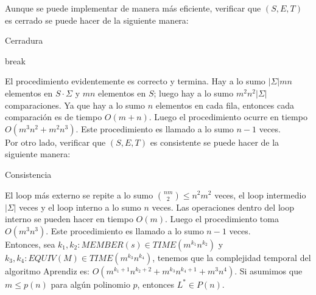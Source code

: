 \documentclass[12pt]{amsart}
\begin{document}
Aunque se puede implementar de manera más eficiente, verificar que $(S,E,T)$ es cerrado se puede hacer de la siguiente manera:

\begin{algorithm}
\caption{Cerradura}
\begin{algorithmic}[1]
                \State break
            \EndIf
        \EndFor
           \State {}
        \EndIf
    \EndFor
    \State {}
\EndProcedure
\end{algorithmic}
\end{algorithm}

El procedimiento evidentemente es correcto y termina. Hay a lo sumo $|\Sigma|mn$ elementos en $S \cdot \Sigma$ y $mn$ elementos en $S$; luego hay a lo sumo $m^2 n^2 |\Sigma|$ comparaciones. Ya que hay a lo sumo $n$ elementos en cada fila, entonces cada comparación es de tiempo $O(m+n)$. Luego el procedimiento ocurre en tiempo $O(m^3 n^2+ m^2 n^3)$. Este procedimiento es llamado a lo sumo $n-1$ veces. \\

Por otro lado, verificar que $(S,E,T)$ es consistente se puede hacer de la siguiente manera: \\

\begin{algorithm}
\caption{Consistencia}
\begin{algorithmic}[1]
                        \State {}
                    \EndIf
                \EndFor
            \EndFor
        \EndIf
    \EndFor
    \State {}
\EndProcedure
\end{algorithmic}
\end{algorithm}

El loop más externo se repite a lo sumo $\binom{nm}{2} \leq n^{2} m^{2}$ veces, el loop intermedio $|\Sigma|$ veces y el loop interno a lo sumo $n$ veces. Las operaciones dentro del loop interno se pueden hacer en tiempo $O(m)$. Luego el procedimiento toma $O(m^3 n^3)$. Este procedimiento es llamado a lo sumo $n-1$ veces. \\

Entonces, sea $k_1, k_2: MEMBER(s) \in TIME(m^{k_1} n^{k_2})$ y $k_3, k_4: EQUIV(M) \in TIME(m^{k_3} n^{k_4})$, tenemos que la complejidad temporal del algoritmo Aprendiz es: $O(m^{k_1+1} n^{k_2+2} + m^{k_3} n^{k_4 + 1} + m^3 n^{4})$. Si asumimos que $m \leq p(n)$ para algún polinomio $p$, entonces $L^{*} \in P(n)$. \\
\end{document}
